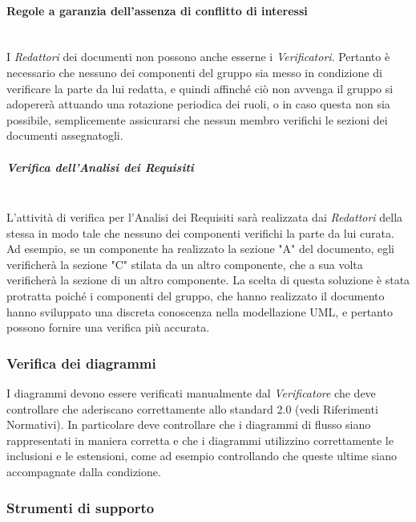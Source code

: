 {\paragraph{Regole a garanzia dell'assenza di conflitto di interessi}\mbox{}\\
I \textit{Redattori} dei documenti non possono anche esserne i \textit{Verificatori}. Pertanto è necessario che nessuno dei componenti del gruppo sia messo in condizione di verificare la parte da lui redatta, e quindi affinché ciò non avvenga il gruppo si adopererà attuando una rotazione periodica dei ruoli, o in caso questa non sia possibile, semplicemente assicurarsi che nessun membro verifichi le sezioni dei documenti assegnatogli.
\subparagraph{Verifica dell'Analisi dei Requisiti}\mbox{}\\
L'attività di verifica per l'Analisi dei Requisiti sarà realizzata dai \textit{Redattori} della stessa in modo tale che nessuno dei componenti verifichi la parte da lui curata.
Ad esempio, se un componente ha realizzato la sezione "A" del documento, egli verificherà la sezione "C" stilata da un altro componente, che a sua volta verificherà la sezione di un altro componente. La scelta di questa soluzione è stata protratta poiché i componenti del gruppo, che hanno realizzato il documento hanno sviluppato una discreta conoscenza nella modellazione UML, e pertanto possono fornire una verifica più accurata.

\subsubsection{Verifica dei diagrammi}
I diagrammi devono essere verificati manualmente dal \textit{Verificatore} che deve controllare che aderiscano correttamente allo standard 2.0 (vedi Riferimenti Normativi). In particolare deve controllare che i diagrammi di flusso siano rappresentati in maniera corretta e che i diagrammi utilizzino correttamente le inclusioni e le estensioni, come ad esempio controllando che queste ultime siano accompagnate dalla condizione.

\subsubsection{Strumenti di supporto}
}
